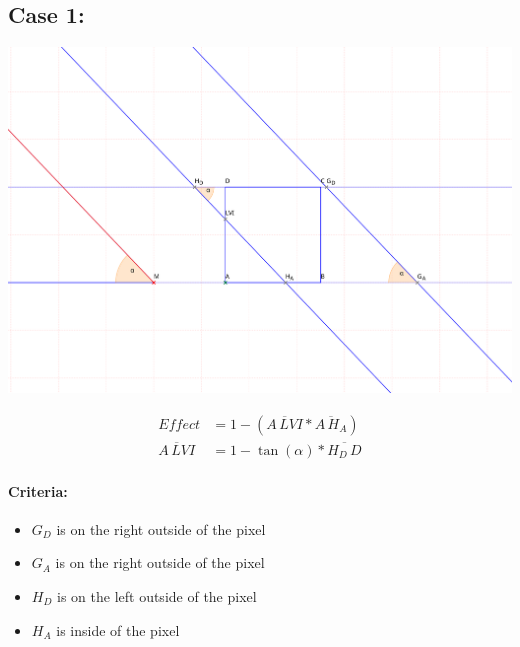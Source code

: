 \documentclass[a4paper,10pt,fleqn]{scrartcl}
\numberwithin{equation}{subsection}
\begin{document}
\subsection{Case 1:}
\begin{minipage}{\textwidth}
\includegraphics[width=\textwidth]{case1}
\end{minipage}
\begin{align}
Effect &= 1 - (\overline{A\,LVI} * \overline{A\,H_A})\\
\overline{A\,LVI} &=  1 - \tan(\alpha) * \overline{H_D\,D}
\end{align}
\paragraph{Criteria:}
\begin{itemize}
 \item $G_D$ is on the right outside of the pixel
 \item $G_A$ is on the right outside of the pixel
 \item $H_D$ is on the left outside of the pixel
 \item $H_A$ is inside of the pixel
\end{itemize}
%
\end{document}
